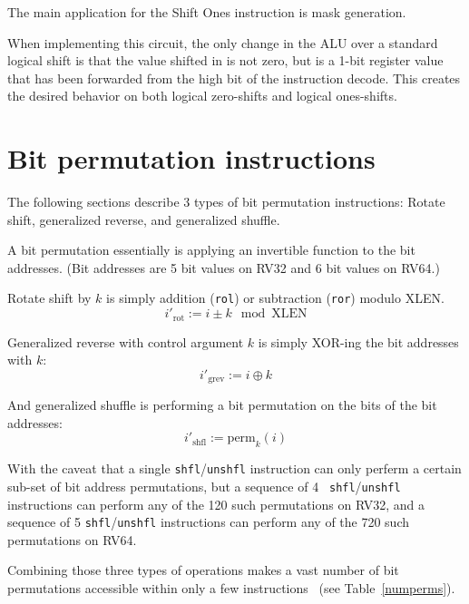 The main application for the Shift Ones instruction is mask generation.

When implementing this circuit, the only change in the ALU over a
standard logical shift is that the value shifted in is not zero, but is
a 1-bit register value that has been forwarded from the high bit of the
instruction decode. This creates the desired behavior on both logical
zero-shifts and logical ones-shifts.


\section{Bit permutation instructions}

The following sections describe 3 types of bit permutation instructions: Rotate
shift, generalized reverse, and generalized shuffle.

A bit permutation essentially is applying an invertible function to the bit addresses. (Bit
addresses are 5 bit values on RV32 and 6 bit values on RV64.)

Rotate shift by $k$ is simply addition ({\tt rol}) or subtraction ({\tt ror}) modulo XLEN.
$$ i'_\mathrm{rot} := i \pm k \mod \mathrm{XLEN} $$

Generalized reverse with control argument $k$ is simply XOR-ing the bit addresses with $k$:
$$ i'_\mathrm{grev} := i \oplus k $$

And generalized shuffle is performing a bit permutation on the bits of the bit addresses:
$$ i'_\mathrm{shfl} := \mathrm{perm}_k(i) $$

With the caveat that a single {\tt shfl}/{\tt unshfl} instruction can only
perferm a certain sub-set of bit address permutations, but a sequence of 4 {\tt
shfl}/{\tt unshfl} instructions can perform any of the 120 such permutations on
RV32, and a sequence of 5 {\tt shfl}/{\tt unshfl} instructions can perform any
of the 720 such permutations on RV64.

Combining those three types of operations makes a vast number of bit
permutations accessible within only a few instructions~\cite{Wolf19A} (see
Table~\ref{numperms}).

